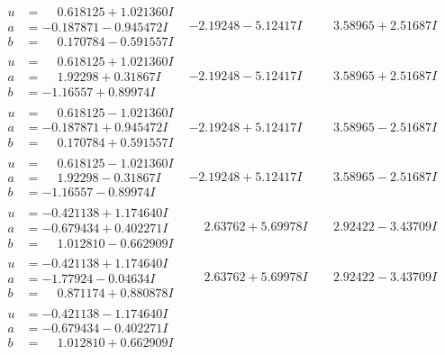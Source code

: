 \documentclass[1p]{elsarticle_modified}
\theoremstyle{definition}
\begin{document}
$$\begin{array}{c|c|c}
\begin{aligned}
u &= \phantom{-}0.618125 + 1.021360 I \\
a &= -0.187871 - 0.945472 I \\
b &= \phantom{-}0.170784 - 0.591557 I\end{aligned}
 & -2.19248 - 5.12417 I & \phantom{-}3.58965 + 2.51687 I \\ \hline\begin{aligned}
u &= \phantom{-}0.618125 + 1.021360 I \\
a &= \phantom{-}1.92298 + 0.31867 I \\
b &= -1.16557 + 0.89974 I\end{aligned}
 & -2.19248 - 5.12417 I & \phantom{-}3.58965 + 2.51687 I \\ \hline\begin{aligned}
u &= \phantom{-}0.618125 - 1.021360 I \\
a &= -0.187871 + 0.945472 I \\
b &= \phantom{-}0.170784 + 0.591557 I\end{aligned}
 & -2.19248 + 5.12417 I & \phantom{-}3.58965 - 2.51687 I \\ \hline\begin{aligned}
u &= \phantom{-}0.618125 - 1.021360 I \\
a &= \phantom{-}1.92298 - 0.31867 I \\
b &= -1.16557 - 0.89974 I\end{aligned}
 & -2.19248 + 5.12417 I & \phantom{-}3.58965 - 2.51687 I \\ \hline\begin{aligned}
u &= -0.421138 + 1.174640 I \\
a &= -0.679434 + 0.402271 I \\
b &= \phantom{-}1.012810 - 0.662909 I\end{aligned}
 & \phantom{-}2.63762 + 5.69978 I & \phantom{-}2.92422 - 3.43709 I \\ \hline\begin{aligned}
u &= -0.421138 + 1.174640 I \\
a &= -1.77924 - 0.04634 I \\
b &= \phantom{-}0.871174 + 0.880878 I\end{aligned}
 & \phantom{-}2.63762 + 5.69978 I & \phantom{-}2.92422 - 3.43709 I \\ \hline\begin{aligned}
u &= -0.421138 - 1.174640 I \\
a &= -0.679434 - 0.402271 I \\
b &= \phantom{-}1.012810 + 0.662909 I\end{aligned}

\end{array}$$
\end{document}
